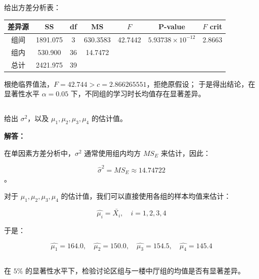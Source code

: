 \documentclass[12pt,a4paper]{article}
\begin{document}
\begin{answerbox}
给出方差分析表：

\begin{center}
\renewcommand{\arraystretch}{1.2}
\begin{tabular}{ccccccc}
\toprule
差异源 & SS & df & MS & $F$ & P-value & $F$ crit \\
\midrule
组间 & 1891.075 & 3  & 630.3583 & 42.7442 & $5.93738\times 10^{-12}$ & 2.8663 \\
组内 & 530.900  & 36 & 14.7472  &         &                         &        \\
总计 & 2421.975 & 39 &          &         &                         &        \\
\bottomrule
\end{tabular}
\end{center}

根绝临界值法，$F = 42.744 > c = 2.866265551$，拒绝原假设；
于是得出结论，在显著性水平 $\alpha=0.05$ 下，不同组的学习时长均值存在显著差异。

\end{answerbox}

\subsection{}

给出 $\sigma^2$，以及 $\mu_1,\mu_2,\mu_3,\mu_4$ 的估计值。

\begin{answerbox}
\textbf{解答：}

在单因素方差分析中，$\sigma^2$ 通常使用组内均方 $MS_E$ 来估计，因此：

$$\hat{\sigma}^2 = MS_E \approx 14.74722$$。

对于 $\mu_1, \mu_2, \mu_3, \mu_4$ 的估计值，我们可以直接使用各组的样本均值来估计：

$$
\hat{\mu_i} = \bar{X_i}, \quad i=1,2,3,4
$$

于是：

$$
\hat{\mu_1} = 164.0, \quad \hat{\mu_2} = 150.0, \quad \hat{\mu_3} = 154.5, \quad \hat{\mu_4} = 145.4
$$

\end{answerbox}

\subsection{}

在 $5\%$ 的显著性水平下，检验讨论区组与一楼中厅组的均值是否有显著差异。
\end{document}
